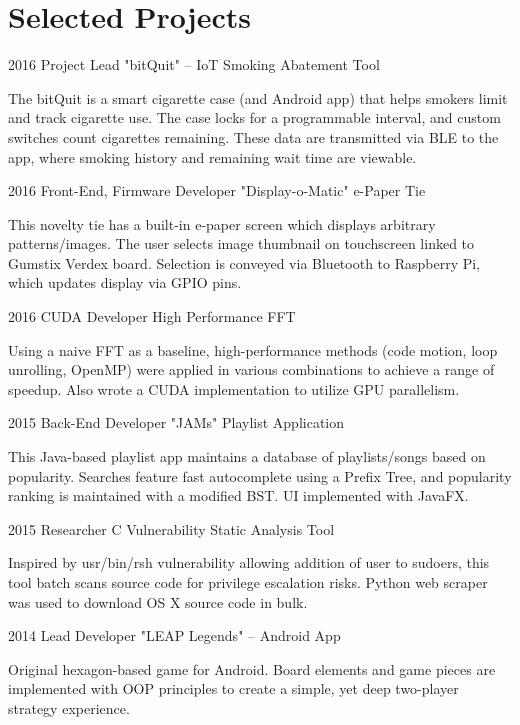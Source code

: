 \documentclass{tccv_AH}
\begin{document}
\vfill



\section{Selected Projects}

\begin{eventlist}

\item{2016}
     {Project Lead}
     {"bitQuit" -- IoT Smoking Abatement Tool}

The bitQuit is a smart cigarette case (and Android app) that helps smokers limit and track cigarette use. The case locks for a programmable interval, and custom switches count cigarettes remaining. These data are transmitted via BLE to the app, where smoking history and remaining wait time are viewable.

\item{2016}
     {Front-End, Firmware Developer}
     {"Display-o-Matic" e-Paper Tie}
     
This novelty tie has a built-in e-paper screen which displays arbitrary patterns/images. The user selects image thumbnail on touchscreen linked to Gumstix Verdex board. Selection is conveyed via Bluetooth to Raspberry Pi, which updates display via GPIO pins.



\item{2016}
     {CUDA Developer}
     {High Performance FFT}

Using a naive FFT as a baseline, high-performance methods (code motion, loop unrolling, OpenMP) were applied in various combinations to achieve a range of speedup. Also wrote a CUDA implementation to utilize GPU parallelism.

\item{2015}
     {Back-End Developer}
     {"JAMs" Playlist Application}

This Java-based playlist app maintains a database of playlists/songs based on popularity. Searches feature fast autocomplete using a Prefix Tree, and popularity ranking is maintained with a modified BST. UI implemented with JavaFX.


\item{2015}
     {Researcher}
     {C Vulnerability Static Analysis Tool}

Inspired by usr/bin/rsh vulnerability allowing addition of user to sudoers, this tool batch scans source code for privilege escalation risks. Python web scraper was used to download OS X source code in bulk.


\item{2014}
     {Lead Developer}
     {"LEAP Legends" -- Android App}

Original hexagon-based game for Android. Board elements and game pieces are implemented with OOP principles to create a simple, yet deep two-player strategy experience. 

\end{eventlist}
\end{document}
